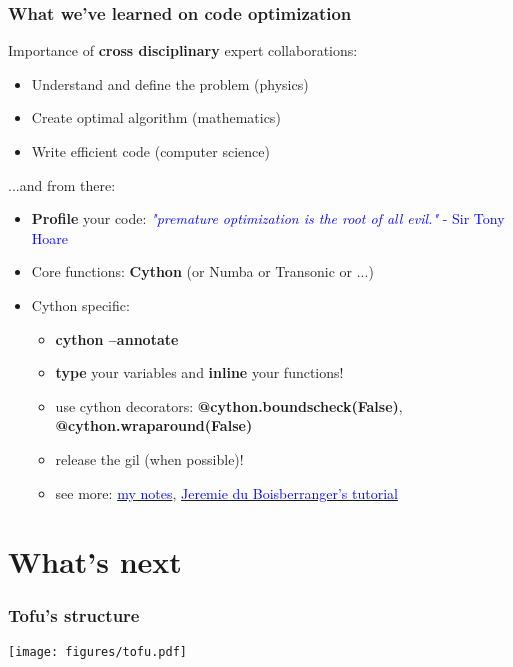 \documentclass[10pt]{beamer}
\begin{document}
\begin{frame}
\frametitle{What we've learned on code optimization}

Importance of \textbf{cross disciplinary} expert collaborations:

	\begin{itemize}
		\item Understand and define the problem (physics)
		\item Create optimal algorithm (mathematics)
		\item Write efficient code (computer science)
	\end{itemize}

...and from there:

	\begin{itemize}
		\item \textbf{Profile} your code:  {\textcolor{blue}{\textit{"premature optimization is the root of all evil."} - Sir Tony Hoare}}
		\item Core functions: \textbf{Cython} (or Numba or Transonic or ...)
		\item Cython specific:
		\begin{itemize}
			\item \textbf{cython --annotate}
			\item \textbf{type} your variables and \textbf{inline} your functions!
			\item use cython decorators: \textbf{@cython.boundscheck(False)}, \textbf{@cython.wraparound(False)}
			\item release the gil (when possible)!
			\item see more: \href{https://github.com/ToFuProject/tofu/blob/master/Notebooks/Cython_speedup_notes.ipynb}{\textcolor{blue}{my notes}}, \href{https://github.com/jeremiedbb/tutorial-euroscipy-2019}{\textcolor{blue}{Jeremie du Boisberranger's tutorial}}

		\end{itemize}
	\end{itemize}

\end{frame}


\section{What's next}


\begin{frame}
\frametitle{Tofu's structure}

\begin{center}
	\texttt{[image: figures/tofu.pdf]}
\end{center}

\end{frame}
\end{document}
